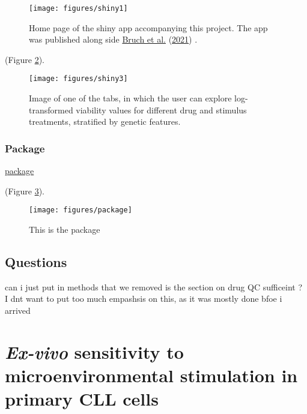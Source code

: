 \documentclass[11pt, a4paper, twosided]{book}
\begin{document}
\begin{figure}

{\centering \texttt{[image: figures/shiny1]} 

}

\caption{Home page of the shiny app accompanying this project. The app was published along side \protect\hyperlink{ref-Giles2021}{Bruch et al.} (\protect\hyperlink{ref-Giles2021}{2021}) .}\label{fig:shinyApp1}
\end{figure}
(Figure \ref{fig:shinyApp3}).


\begin{figure}

{\centering \texttt{[image: figures/shiny3]} 

}

\caption{Image of one of the tabs, in which the user can explore log-transformed viability values for different drug and stimulus treatments, stratified by genetic features.}\label{fig:shinyApp3}
\end{figure}
\hypertarget{package}{%
\subsection{Package}\label{package}}

\href{https://github.com/Huber-group-EMBL/CLLCytokineScreen2021}{package}

(Figure \ref{fig:package1}).


\begin{figure}

{\centering \texttt{[image: figures/package]} 

}

\caption{This is the package}\label{fig:package1}
\end{figure}
\hypertarget{questions}{%
\section{Questions}\label{questions}}

can i just put in methods that we removed
is the section on drug QC sufficeint ? I dnt want to put too much empashsis on this, as it was mostly done bfoe i arrived

\hypertarget{chapter4}{%
\chapter{\texorpdfstring{\emph{Ex-vivo} sensitivity to microenvironmental stimulation in primary CLL cells}{Ex-vivo sensitivity to microenvironmental stimulation in primary CLL cells}}\label{chapter4}}
\end{document}
